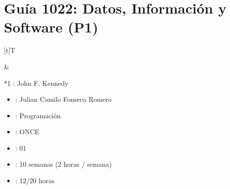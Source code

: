\documentclass[letterpaper,10pt,spanish]{sphinxmanual}
\begin{document}
\sphinxstepscope


\section{Guía 1022: Datos, Información y Software (P1)}
\label{\detokenize{1_guias/10programacion/G1022:guia-1022-datos-informacion-y-software-p1}}\label{\detokenize{1_guias/10programacion/G1022::doc}}

\begin{savenotes}\sphinxattablestart
\sphinxthistablewithglobalstyle
\centering
\begin{tabular}[t]{}
\sphinxtoprule
\sphinxtableatstartofbodyhook

\begin{savenotes}\sphinxattablestart
\sphinxthistablewithglobalstyle
\centering
\begin{tabulary}{\linewidth}[t]{T}
\sphinxtoprule
\sphinxtableatstartofbodyhook
\sphinxAtStartPar
{}
\\
\sphinxbottomrule
\end{tabulary}
\sphinxtableafterendhook\par
\sphinxattableend\end{savenotes}
&

\begin{savenotes}\sphinxattablestart
\sphinxthistablewithglobalstyle
\raggedright
\begin{tabular}[t]{*{1}{}}
\sphinxtoprule
\sphinxtableatstartofbodyhook
\sphinxAtStartPar
{}: John F. Kennedy
\begin{itemize}
\item {} 
\sphinxAtStartPar
{}: Julian Camilo Fonseca Romero

\item {} 
\sphinxAtStartPar
{}: Programación

\item {} 
\sphinxAtStartPar
{}: ONCE

\item {} 
\sphinxAtStartPar
{}: 01

\item {} 
\sphinxAtStartPar
{}: 10 semanas (2 horas / semana)

\item {} 
\sphinxAtStartPar
{}: 12/20 horas

\end{itemize}
\\
\sphinxbottomrule
\end{tabular}
\sphinxtableafterendhook\par
\sphinxattableend\end{savenotes}
\\
\sphinxbottomrule
\end{tabular}
\sphinxtableafterendhook\par
\sphinxattableend\end{savenotes}
\end{document}
